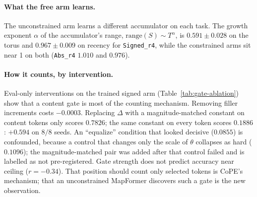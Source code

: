 \documentclass[10pt]{article}
\newcommand{\arm}[1]{\texttt{#1}}
\begin{document}
\paragraph{What the free arm learns.} The unconstrained arm learns a different accumulator on each
task. The growth exponent $\alpha$ of the accumulator's range, $\mathrm{range}(S)\sim T^{\alpha}$, is
$0.591\pm0.028$ on the torus and $0.967\pm0.009$ on recency for \arm{Signed\_r4}, while the constrained
arms sit near 1 on both (\arm{Abs\_r4} $1.010$ and $0.976$). %

\paragraph{How it counts, by intervention.} Eval-only interventions on the trained signed arm
(Table~\ref{tab:gate-ablation}) show that a content gate is most of the counting mechanism. Removing
filler increments costs $-0.0003$. Replacing $\Delta$ with a magnitude-matched constant on content tokens
only scores $0.7826$; the same constant on every token scores $0.1886$: $+0.594$ on $8/8$ seeds. An
``equalize'' condition that looked decisive ($0.0855$) is confounded, because a control that changes only
the scale of $\theta$ collapses as hard ($0.1096$); the magnitude-matched pair was added after that
control failed and is labelled as not pre-registered. Gate strength does not predict accuracy near
ceiling ($r=-0.34$). That position should count only selected tokens is CoPE's mechanism; that an
unconstrained MapFormer discovers such a gate is the new observation. %
\end{document}
